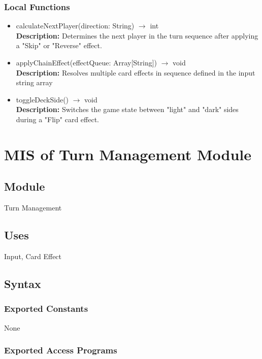 \documentclass[12pt, titlepage]{article}
\begin{document}
\subsubsection{Local Functions}
\begin{itemize}
\item calculateNextPlayer(direction: String) $\rightarrow$ int\\
\textbf{Description:} Determines the next player in the turn sequence after applying a "Skip" or "Reverse" effect.

\item applyChainEffect(effectQueue: Array[String]) $\rightarrow$ void\\
\textbf{Description:} Resolves multiple card effects in sequence defined in the input string array

\item toggleDeckSide() $\rightarrow$ void\\
\textbf{Description:} Switches the game state between "light" and "dark" sides during a "Flip" card effect.
\end{itemize}



\section{MIS of Turn Management Module} 
\label{TMM}

\subsection{Module}
\hspace{1.5em}Turn Management

\subsection{Uses}
\hspace{1.5em}Input, Card Effect

\subsection{Syntax}

\subsubsection{Exported Constants}
\hspace{1.5em}None

\subsubsection{Exported Access Programs}
\end{document}
